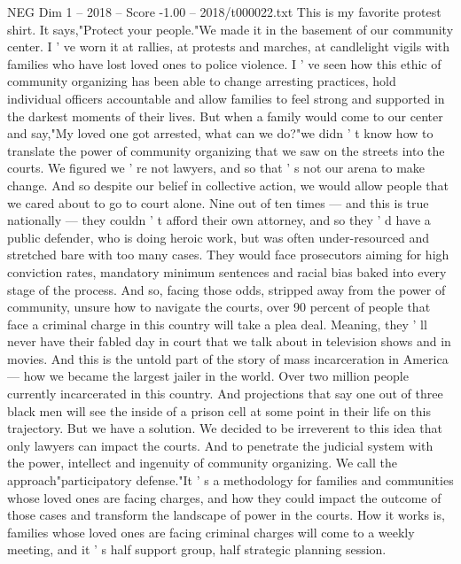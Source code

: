 \begin{textsample}{NEG Dim 1 – 2018 – Score -1.00 – 2018/t000022.txt}  \label{ex:f1_neg_014}
This is my favorite protest shirt.
It says,"Protect your people."We made it in the basement of our community center.
I ' ve worn it at rallies, at protests and marches, at candlelight vigils with families who have lost loved ones to police violence.
I ' ve seen how this ethic of community organizing has been able to change arresting practices, hold individual officers accountable and allow families to feel strong and supported in the darkest moments of their lives.
But when a family would come to our center and say,"My loved one got arrested, what can we do?"we didn ' t know how to translate the power of community organizing that we saw on the streets into the courts.
We figured we ' re not lawyers, and so that ' s not our arena to make change.
And so despite our belief in collective action, we would allow people that we cared about to go to court alone.
Nine out of ten times — and this is true nationally — they couldn ' t afford their own attorney, and so they ' d have a public defender, who is doing heroic work, but was often under-resourced and stretched bare with too many cases.
They would face prosecutors aiming for high conviction rates, mandatory minimum sentences and racial bias baked into every stage of the process.
And so, facing those odds, stripped away from the power of community, unsure how to navigate the courts, over 90 percent of people that face a criminal charge in this country will take a plea deal.
Meaning, they ' ll never have their fabled day in court that we talk about in television shows and in movies.
And this is the untold part of the story of mass incarceration in America — how we became the largest jailer in the world.
Over two million people currently incarcerated in this country.
And projections that say one out of three black men will see the inside of a prison cell at some point in their life on this trajectory.
But we have a solution.
We decided to be irreverent to this idea that only lawyers can impact the courts.
And to penetrate the judicial system with the power, intellect and ingenuity of community organizing.
We call the approach"participatory defense."It ' s a methodology for families and communities whose loved ones are facing charges, and how they could impact the outcome of those cases and transform the landscape of power in the courts.
How it works is, families whose loved ones are facing criminal charges will come to a weekly meeting, and it ' s half support group, half strategic planning session.

\end{textsample}

